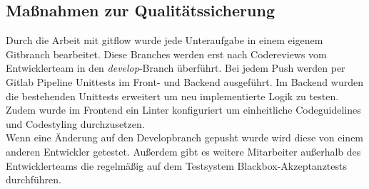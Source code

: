\subsection{Maßnahmen zur Qualitätssicherung}
\label{qualitaetssicherung}
Durch die Arbeit mit \gls{gitflow} wurde jede Unteraufgabe in einem eigenem Gitbranch bearbeitet. Diese Branches werden erst nach Codereviews vom Entwicklerteam in den \textit{develop}-Branch überführt. Bei jedem Push werden per Gitlab Pipeline Unittests im Front- und Backend ausgeführt. Im Backend wurden die bestehenden Unittests erweitert um neu implementierte Logik zu testen. Zudem wurde im Frontend ein \gls{Linter} konfiguriert um einheitliche Codeguidelines und Codestyling durchzusetzen.\\
Wenn eine Änderung auf den Developbranch gepusht wurde wird diese von einem anderen Entwickler getestet. Außerdem gibt es weitere Mitarbeiter außerhalb des Entwicklerteams die regelmäßig auf dem Testsystem Blackbox-Akzeptanztests durchführen.